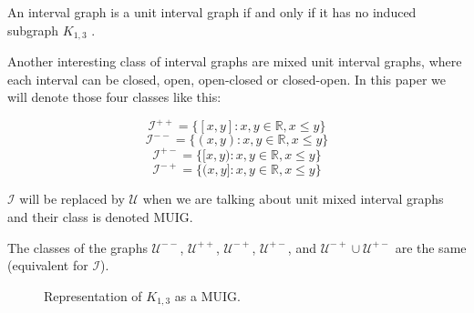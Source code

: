 \begin{theorem}
  An interval graph is a unit interval graph if and only if it has no induced subgraph $K_{1,3}$ \cite{roberts1968representations}.
\end{theorem}

Another interesting class of interval graphs are mixed unit interval graphs, where each
interval can be closed, open, open-closed or closed-open. In this paper we will
denote those four classes like this:

$$\mathcal{I}^{++} = \{[x,y] : x,y \in \mathbb{R}, x\leq y\}$$
$$\mathcal{I}^{--} = \{(x,y) : x,y \in \mathbb{R}, x\leq y\}$$
$$\mathcal{I}^{+-} = \{[x,y) : x,y \in \mathbb{R}, x\leq y\}$$
$$\mathcal{I}^{-+} = \{(x,y] : x,y \in \mathbb{R}, x\leq y\}$$

$\mathcal{I}$ will be replaced by $\mathcal{U}$ when we are talking about unit
mixed interval graphs and their class is denoted MUIG.

\begin{theorem}
  The classes of the graphs $\mathcal{U}^{--}$, $\mathcal{U}^{++}$,
  $\mathcal{U}^{-+}$, $\mathcal{U}^{+-}$, and  $\mathcal{U}^{-+} \cup
  \mathcal{U}^{+-}$ are the same (equivalent for $\mathcal{I}$). \cite{DOURADO20123357}
\end{theorem}



\begin{figure}
\centering


\begin{scaletikzpicturetowidth}{\textwidth}
\end{scaletikzpicturetowidth}

\caption{Representation of $K_{1,3}$ as a MUIG.}
\label{fig:muigK13}
\end{figure}

